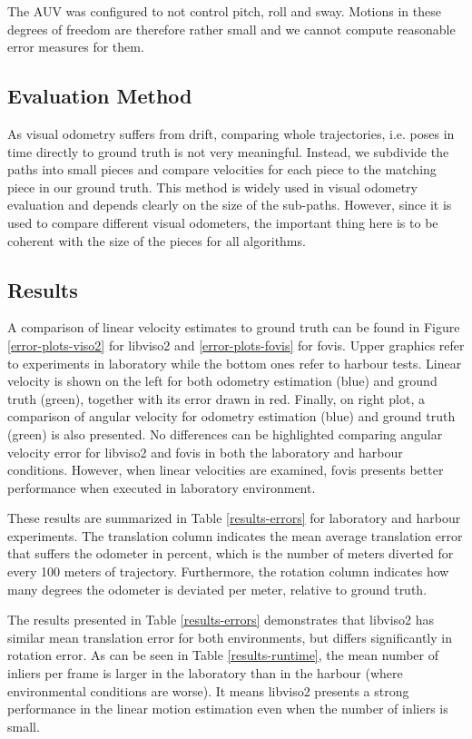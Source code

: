 \documentclass[conference]{IEEEtran}
\begin{document}
The AUV was configured to not control pitch, roll and sway. Motions in these degrees of freedom are therefore rather small and we cannot compute reasonable error measures for them.

\subsection{Evaluation Method
  \label{evaluation-method}
}

As visual odometry suffers from drift, comparing whole trajectories, i.e. poses in time directly to ground truth is not very meaningful. Instead, we subdivide the paths into small pieces and compare velocities for each piece to the matching piece in our ground truth. This method is widely used in visual odometry evaluation \cite{Kitti2013} and depends clearly on the size of the sub-paths. However, since it is used to compare different visual odometers, the important thing here is to be coherent with the size of the pieces for all algorithms.

\subsection{Results
  \label{results}
}

A comparison of linear velocity estimates to ground truth can be found in Figure \ref{error-plots-viso2} for libviso2 and \ref{error-plots-fovis} for fovis. Upper graphics refer to experiments in laboratory while the bottom ones refer to harbour tests. Linear velocity is shown on the left for both odometry estimation (blue) and ground truth (green), together with its error drawn in red. Finally, on right plot, a comparison of angular velocity for odometry estimation (blue) and ground truth (green) is also presented. No differences can be highlighted comparing angular velocity error for libviso2 and fovis in both the laboratory and harbour conditions. However, when linear velocities are examined, fovis presents better performance when executed in laboratory environment.

These results are summarized in Table \ref{results-errors} for laboratory and harbour experiments. The translation column indicates the mean average translation error that suffers the odometer in percent, which is the number of meters diverted for every 100 meters of trajectory. Furthermore, the rotation column indicates how many degrees the odometer is deviated per meter, relative to ground truth.

The results presented in Table \ref{results-errors} demonstrates that libviso2 has similar mean translation error for both environments, but differs significantly in rotation error. As can be seen in Table \ref{results-runtime}, the mean number of inliers per frame is larger in the laboratory than in the harbour (where environmental conditions are worse). It means libviso2 presents a strong performance in the linear motion estimation even when the number of inliers is small.
\end{document}
